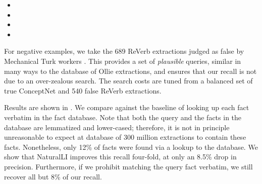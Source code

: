 \begin{itemize}
\setlength{\itemsep}{-4pt}
\item[] 
\item[] 
\item[] 
\item[] 
\end{itemize}

For negative examples, we take the 689 ReVerb extractions
  \cite{key:2011fader-reverb}
  judged as false by Mechanical Turk workers \cite{2013angeli-truth}.
This provides a set of \textit{plausible} queries, similar in many
  ways to the database of Ollie extractions, and ensures that our
  recall is not due to an over-zealous search.
The search costs are tuned from a balanced set of true ConceptNet and
  540 false ReVerb extractions.

Results are shown in .
We compare against the baseline of looking up each fact verbatim in the
  fact database.
Note that both the query and the facts in the database are lemmatized
  and lower-cased; therefore, it is not in principle unreasonable to
  expect at database of 300 million extractions to contain these
  facts.
Nonetheless, only 12\% of facts were found via a lookup to the
  database.
We show that NaturalLI improves this recall four-fold, at only an
  8.5\% drop in precision.
Furthermore, if we prohibit matching the query fact verbatim,
  we still recover all but 8\% of our recall.



%
%
